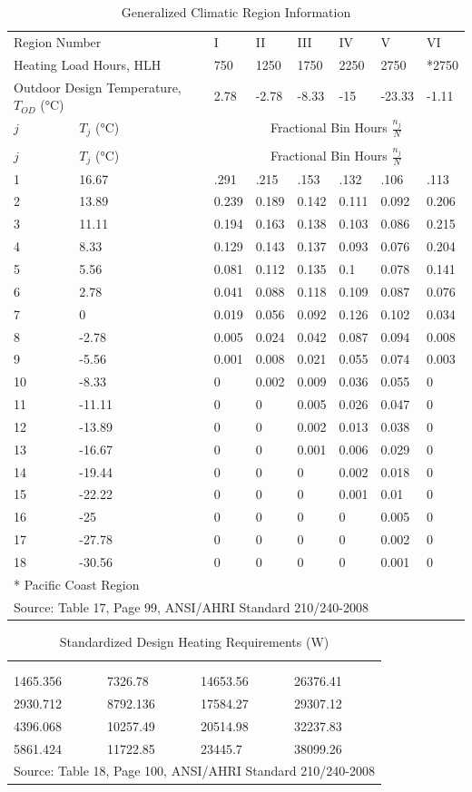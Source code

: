\begin{longtable}[c]{p{0.75in}p{0.75in}p{0.75in}p{0.75in}p{0.75in}p{0.75in}p{0.75in}p{0.75in}}
\caption{Generalized Climatic Region Information \label{table:generalized-climatic-region-information}} \tabularnewline
\toprule 
\multicolumn{2}{p{1.5in}}{\raggedright Region Number} & I & II & III & IV & V & VI \tabularnewline
\multicolumn{2}{p{1.5in}}{\raggedright Heating Load Hours, HLH} & 750 & 1250 & 1750 & 2250 & 2750 & *2750 \tabularnewline
\multicolumn{2}{p{1.5in}}{\raggedright Outdoor Design Temperature, \(T_{OD}\) (°C)} & 2.78 & -2.78 & -8.33 & -15 & -23.33 & -1.11 \tabularnewline
\midrule
\(j\) & \(T_j\) (°C) & \multicolumn{6}{c}{Fractional Bin Hours \(\frac{n_j}{N}\)} \tabularnewline
\midrule
\endfirsthead

\caption[]{Generalized Climatic Region Information} \tabularnewline
\toprule 
\(j\) & \(T_j\) (°C) & \multicolumn{6}{c}{Fractional Bin Hours \(\frac{n_j}{N}\)} \tabularnewline
\midrule
\endhead

1 & 16.67 & .291 & .215 & .153 & .132 & .106 & .113 \tabularnewline
2 & 13.89 & 0.239 & 0.189 & 0.142 & 0.111 & 0.092 & 0.206 \tabularnewline
3 & 11.11 & 0.194 & 0.163 & 0.138 & 0.103 & 0.086 & 0.215 \tabularnewline
4 & 8.33 & 0.129 & 0.143 & 0.137 & 0.093 & 0.076 & 0.204 \tabularnewline
5 & 5.56 & 0.081 & 0.112 & 0.135 & 0.1 & 0.078 & 0.141 \tabularnewline
6 & 2.78 & 0.041 & 0.088 & 0.118 & 0.109 & 0.087 & 0.076 \tabularnewline
7 & 0 & 0.019 & 0.056 & 0.092 & 0.126 & 0.102 & 0.034 \tabularnewline
8 & -2.78 & 0.005 & 0.024 & 0.042 & 0.087 & 0.094 & 0.008 \tabularnewline
9 & -5.56 & 0.001 & 0.008 & 0.021 & 0.055 & 0.074 & 0.003 \tabularnewline
10 & -8.33 & 0 & 0.002 & 0.009 & 0.036 & 0.055 & 0 \tabularnewline
11 & -11.11 & 0 & 0 & 0.005 & 0.026 & 0.047 & 0 \tabularnewline
12 & -13.89 & 0 & 0 & 0.002 & 0.013 & 0.038 & 0 \tabularnewline
13 & -16.67 & 0 & 0 & 0.001 & 0.006 & 0.029 & 0 \tabularnewline
14 & -19.44 & 0 & 0 & 0 & 0.002 & 0.018 & 0 \tabularnewline
15 & -22.22 & 0 & 0 & 0 & 0.001 & 0.01 & 0 \tabularnewline
16 & -25 & 0 & 0 & 0 & 0 & 0.005 & 0 \tabularnewline
17 & -27.78 & 0 & 0 & 0 & 0 & 0.002 & 0 \tabularnewline
18 & -30.56 & 0 & 0 & 0 & 0 & 0.001 & 0 \tabularnewline
\bottomrule
\multicolumn{8}{l}{* Pacific Coast Region} \tabularnewline
\multicolumn{8}{l}{Source: Table 17, Page 99, ANSI/AHRI Standard 210/240-2008}
\end{longtable}

\begin{longtable}[c]{p{1.5in}p{1.5in}p{1.5in}p{1.5in}}
\caption{Standardized Design Heating Requirements (W) \label{table:standardized-design-heating-requirements-w}} \tabularnewline
\toprule 
\tabularnewline
\endfirsthead

\caption[]{Standardized Design Heating Requirements (W)} \tabularnewline
\toprule 
\tabularnewline
\endhead

1465.356 & 7326.78 & 14653.56 & 26376.41 \tabularnewline
2930.712 & 8792.136 & 17584.27 & 29307.12 \tabularnewline
4396.068 & 10257.49 & 20514.98 & 32237.83 \tabularnewline
5861.424 & 11722.85 & 23445.7 & 38099.26 \tabularnewline
\bottomrule
\multicolumn{4}{l}{Source: Table 18, Page 100, ANSI/AHRI Standard 210/240-2008}
\end{longtable}

